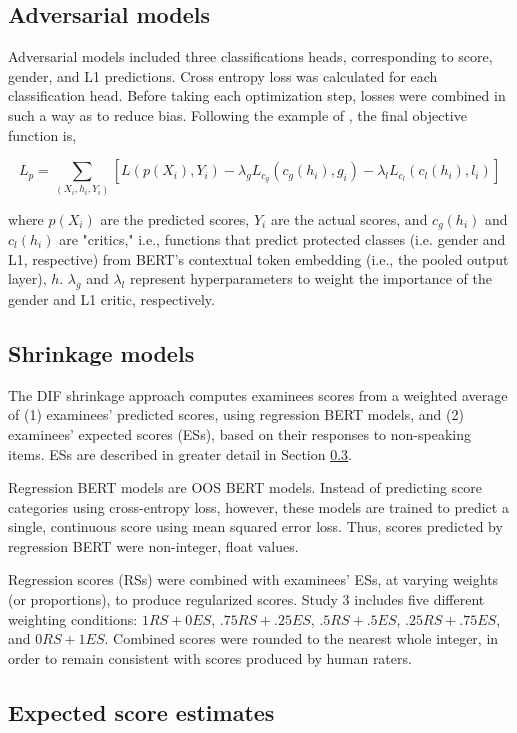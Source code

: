 \documentclass [PhD] {uclathes}
\begin{document}
\subsection{Adversarial models}

Adversarial models included three classifications heads, corresponding to score, gender, and L1 predictions. Cross entropy loss was calculated for each classification head. Before taking each optimization step, losses were combined in such a way as to reduce bias. Following the example of \citet{wang2019balanced}, the final objective function is, 

$$
L_p = \sum_{(X_i, h_i, Y_i)} [L(p(X_i), Y_i) - \lambda_g L_{c_g}(c_g(h_i), g_i) - \lambda_l L_{c_l}(c_l(h_i), l_i)] 
$$

where $p(X_i)$ are the predicted scores, $Y_i$ are the actual scores, and $c_g(h_i)$ and $c_l(h_i)$ are "critics," i.e., functions that predict protected classes (i.e. gender and L1, respective) from BERT’s contextual token embedding (i.e., the pooled output layer), $h$. $\lambda_g$ and $\lambda_l$ represent hyperparameters to weight the importance of the gender and L1 critic, respectively. 

\subsection{Shrinkage models}

The DIF shrinkage approach computes examinees scores from a weighted average of (1) examinees’ predicted scores, using regression BERT models, and (2) examinees' expected scores (ESs), based on their responses to non-speaking items. ESs are described in greater detail in Section \ref{sec:meth_es}. 

Regression BERT models are OOS BERT models. Instead of predicting score categories using cross-entropy loss, however, these models are trained to predict a single, continuous score using mean squared error loss. Thus, scores predicted by regression BERT were non-integer, float values. 

Regression scores (RSs) were combined with examinees’ ESs, at varying weights (or proportions), to produce regularized scores. Study 3 includes five different weighting conditions: $1 RS + 0 ES$, $.75 RS + .25 ES$, $.5 RS + .5 ES$, $.25 RS + .75 ES$, and $0 RS + 1 ES$. Combined scores were rounded to the nearest whole integer, in order to remain consistent with scores produced by human raters. 

\subsection{Expected score estimates}
\label{sec:meth_es}
\end{document}
